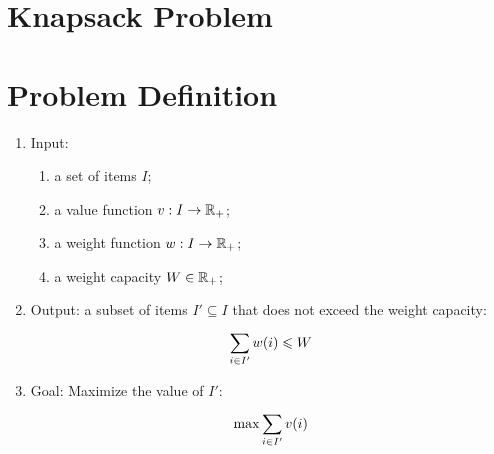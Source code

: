 \section{Knapsack Problem}

\section{Problem Definition}

\begin{enumerate}
    \item Input:
    \begin{enumerate}
        \item a set of items $I$;
        \item a value function $v : I \rightarrow \mathbb{R}_+$;
        \item a weight function $w : I \rightarrow \mathbb{R}_+$;
        \item a weight capacity $W \in \mathbb{R}_+$;
    \end{enumerate}
    \item Output: a subset of items $I' \subseteq I$ that does not exceed the weight capacity:
    \begin{equation}
        \displaystyle\sum\limits_{i \in I'}^{} w(i) \leqslant W
    \end{equation}
    \item Goal: Maximize the value of $I'$:
    \begin{equation}
        \max \displaystyle\sum\limits_{i \in I'}^{} v(i)
    \end{equation}
\end{enumerate}


